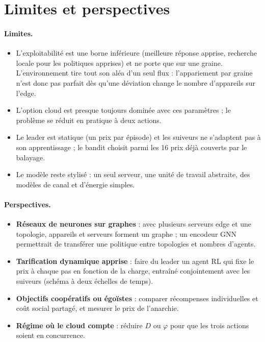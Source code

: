 \documentclass[11pt,a4paper]{article}
\begin{document}
\section{Limites et perspectives}

\paragraph{Limites.}
\begin{itemize}
  \item L'exploitabilité est une borne inférieure (meilleure réponse apprise, recherche locale pour les politiques
        apprises) et ne porte que sur une graine. L'environnement tire tout son aléa d'un seul flux : l'appariement
        par graine n'est donc pas parfait dès qu'une déviation change le nombre d'appareils sur l'edge.
  \item L'option cloud est presque toujours dominée avec ces paramètres ; le problème se réduit en pratique à
        deux actions.
  \item Le leader est statique (un prix par épisode) et les suiveurs ne s'adaptent pas à son apprentissage ; le
        bandit choisit parmi les 16 prix déjà couverts par le balayage.
  \item Le modèle reste stylisé : un seul serveur, une unité de travail abstraite, des modèles de canal et
        d'énergie simples.
\end{itemize}

\paragraph{Perspectives.}
\begin{itemize}
  \item \textbf{Réseaux de neurones sur graphes} : avec plusieurs serveurs edge et une topologie, appareils et
        serveurs forment un graphe ; un encodeur GNN permettrait de transférer une politique entre topologies et
        nombres d'agents.
  \item \textbf{Tarification dynamique apprise} : faire du leader un agent RL qui fixe le prix à chaque pas en
        fonction de la charge, entraîné conjointement avec les suiveurs (schéma à deux échelles de temps).
  \item \textbf{Objectifs coopératifs ou égoïstes} : comparer récompenses individuelles et coût social partagé, et
        mesurer le prix de l'anarchie.
  \item \textbf{Régime où le cloud compte} : réduire $D$ ou $\varphi$ pour que les trois actions soient en
        concurrence.
\end{itemize}
\end{document}
